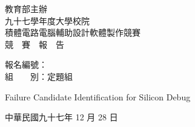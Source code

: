 \begin{titlepage}

\begin{center}

\begin{Large}
教育部主辦\\
九十七學年度大學校院\\
積體電路電腦輔助設計軟體製作競賽\\
競　賽　報　告
\end{Large}

\vfill

\begin{large}
報名編號：　　　\\
組　　別：定題組
\end{large}

\vfill

\begin{Large}
Failure Candidate Identification for Silicon Debug
\end{Large}

\vfill

\begin{large}
中華民國九十七年 12 月 28 日
\end{large}

\end{center}

\end{titlepage}

